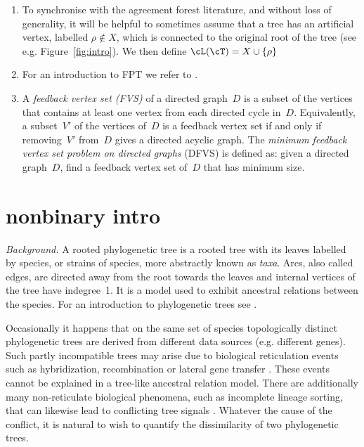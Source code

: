 \begin{enumerate}
 \item To synchronise with the agreement forest literature, and without loss of generality, it will be helpful to sometimes assume that a tree has an artificial vertex, labelled $\rho \not \in X$, which is connected to the original root of the tree (see e.g. Figure~\ref{fig:intro}). We then define $\cL(\cT) = X \cup \{\rho\}$
 \item For an introduction to FPT we refer to \cite{downey1999,Flum2006,Gramm2008,niedermeier2006}.
 \item A \emph{feedback vertex set (FVS)} of a directed graph~$D$ is a subset of the vertices that contains at least one vertex from each directed cycle in~$D$. Equivalently, a subset~$V'$ of the vertices of~$D$ is a feedback vertex set if and only if removing~$V'$ from~$D$ gives a directed acyclic graph. The \emph{minimum feedback vertex set problem on directed graphs} (DFVS) is defined as: given a directed graph~$D$, find a feedback vertex set of~$D$ that has minimum size.
\end{enumerate}



\section{nonbinary intro}

\emph{Background.} A rooted phylogenetic tree is a rooted tree with its leaves labelled by species, or strains of species, more abstractly
known as \emph{taxa}. Arcs, also called edges, are directed away from the root towards the leaves and internal vertices of the tree have indegree~1. It is a model used to exhibit ancestral relations between the species. For an
introduction to phylogenetic trees see \cite{MathEvPhyl,reconstructingevolution,SempleSteel2003}.

Occasionally it happens that on the same set of species topologically distinct phylogenetic trees are derived from different data sources (e.g. different genes). Such partly incompatible trees may arise due to biological reticulation events such as hybridization, recombination or lateral gene transfer \cite{HusonRuppScornavacca10,davidbook,Nakhleh2009ProbSolv}. These events cannot be explained in a tree-like ancestral relation model. There are additionally many non-reticulate biological phenomena, such as incomplete lineage sorting, that can likewise lead to conflicting tree signals  \cite{davidbook,Nakhleh2009ProbSolv}. Whatever the cause of the conflict, it is natural to wish to quantify the dissimilarity of two phylogenetic trees.

